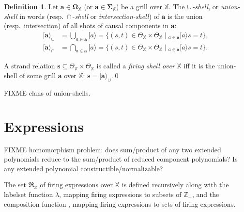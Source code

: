 \documentclass [a4paper,12pt] {article}
\theoremstyle{definition}
\newtheorem{definition}{Definition}[section]
\newcommand{\Forall}{}
\DeclareRobustCommand{\Forall}{\displaystyle\mathop{\textstyle\mathlarger{\forall}}}
\newcommand{\Exists}{}
\DeclareRobustCommand{\Exists}{\displaystyle\mathop{\textstyle\mathlarger{\exists}}}
\newcommand{\composition}{}
\DeclareRobustCommand{\composition}{\mathop{\textstyle\mathsmaller{\bf {Com}}}}
\begin{document}
\begin {definition}\label{def-shell}
  Let $\bm{a} \in \bm{\Omega}_{\mathbb X}$ (or $\bm{a} \in
  \bm{\Sigma}_{\mathbb X}$) be a grill over ${\mathbb X}$.  The
  $\cup$\,-{\em shell}\/, or {\em union-shell}\/ in words
  (resp.\ $\cap$\,-{\em shell}\/ or {\em intersection-shell}\/) of
  $\bm{a}$ is the union (resp.\ intersection) of all shots of causal
  components in $\bm{a}$:
  \begin {align*}
    [\bm{a}\rangle_\cup &= \bigcup_{a \in \bm{a}}[a\rangle = \{(s, t)
        \in \Theta_{\mathbb X}\!\times\!\Theta_{\mathbb X} \;|\;
        \Exists_{a \in \bm{a}}[a\rangle s = t\},\\
    [\bm{a}\rangle_\cap &= \bigcap_{a \in \bm{a}}[a\rangle = \{(s, t)
        \in \Theta_{\mathbb X}\!\times\!\Theta_{\mathbb X} \;|\;
        \Forall_{a \in \bm{a}}[a\rangle s = t\}.
  \end {align*}

  A strand relation $\bm{s} \subseteq \Theta_{\mathbb X} \times
  \Theta_{\mathbb X}$ is called a {\em firing shell over}\/ ${\mathbb
    X}$ iff it is the union-shell of some grill $\bm{a}$ over
  ${\mathbb X}$: $\bm{s} = [\bm{a}\rangle_\cup$.\qed
\end {definition}

FIXME clans of union-shells.

\section {Expressions}

FIXME homomorphism problem: does sum/product of any two extended
polynomials reduce to the sum/product of reduced component
polynomials?  Is any extended polynomial constructible/normalizable?

The set $\mathfrak{R}_{\mathbb X}$ of firing expressions over
${\mathbb X}$ is defined recursively along with the labelset function
$\lambda$, mapping firing expressions to subsets of ${\mathbb Z}_+$,
and the composition function $\composition$, mapping firing
expressions to sets of firing expressions.
\end{document}
